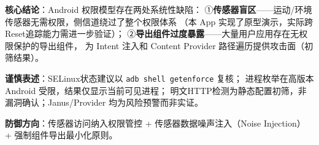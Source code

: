 \documentclass[10pt,a4paper]{article}
\begin{document}
\vspace{3pt}
\noindent\textbf{核心结论}：Android 权限模型存在两处系统性缺陷：
①\textbf{传感器盲区}——运动/环境传感器无需权限，侧信道绕过了整个权限体系
（本 App 实现了原型演示，实际跨Reset追踪能力需进一步验证）；
②\textbf{导出组件过度暴露}——大量用户应用存在无权限保护的导出组件，
为 Intent 注入和 Content Provider 路径遍历提供攻击面（初筛结果）。

\noindent\textbf{谨慎表述}：SELinux状态建议以 \texttt{adb shell getenforce} 复核；
进程枚举在高版本 Android 受限，结果仅显示当前可见进程；
明文HTTP检测为静态配置初筛，非漏洞确认；Janus/Provider 均为风险预警而非实证。

\noindent\textbf{防御方向}：传感器访问纳入权限管控 + 传感器数据噪声注入（Noise Injection） +
强制组件导出最小化原则。
\end{document}
